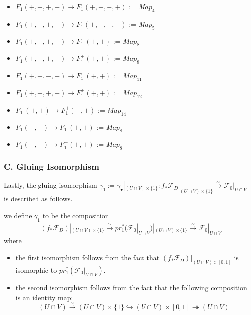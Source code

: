 \begin{itemize}
\item $F_1(+,-,+,+)\rightarrow F_1(+,-,-,+)$ := $Map_4$
\item $F_1(+,-,+,+)\rightarrow F_1(+,-,+,-)$ := $Map_5$
\item $F_1(+,-,+,+)\rightarrow F_1^-(+,+)$ := $Map_8$
\item $F_1(+,-,+,+)\rightarrow F_1^+(+,+)$ := $Map_8$
\item $F_1(+,-,-,+)\rightarrow F_1^-(+,+)$ := $Map_{11}$
\item $F_1(+,-,+,-)\rightarrow F_1^+(+,+)$ := $Map_{12}$
\item $F_1^-(+,+)\rightarrow F_1^+(+,+)$ := $Map_{14}$
\item $F_1(-,+)\rightarrow F_1^-(+,+)$ := $Map_8$
\item $F_1(-,+)\rightarrow F_1^+(+,+)$ := $Map_8$
\end{itemize}

\subsubsection{C. Gluing Isomorphism}
Lastly, the gluing isomorphism $\gamma_1 := \gamma_\bullet|_{(U\cap V)\times \{1\}}:  f_*\mathscr{F}_D|_{(U\cap V)\times \{1\}}\xrightarrow{\sim} \mathscr{F}_0|_{U\cap V}$ is described as follows.

\begin{definition}
we define $\gamma_1$ to be the composition
\begin{align*}
&(f_*\mathscr{F}_D)|_{(U\cap V)\times \{1\}}\xrightarrow{\sim}pr_1^*(\mathscr{F}_0|_{U\cap V})|_{(U\cap V)\times \{1\}}\xrightarrow{\sim}\mathscr{F}_0|_{U\cap V}
\end{align*}
where
\begin{itemize}
\item the first isomorphism follows from the fact that $(f_*\mathscr{F}_D)|_{(U\cap V)\times[0,1]}$ is isomorphic to $pr_1^*(\mathscr{F}_0|_{U\cap V})$.

\item the second isomorphism follows from the fact that the following composition is an identity map:
\[
(U\cap V)\xrightarrow{\sim} (U\cap V)\times \{1\} \hookrightarrow (U\cap V)\times [0,1] \twoheadrightarrow (U\cap V)
\]
\end{itemize}
\end{definition}